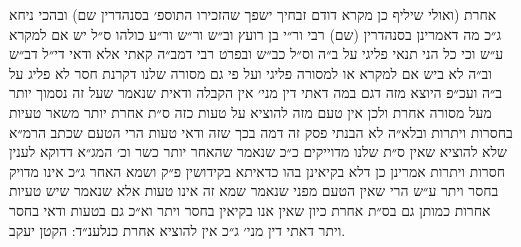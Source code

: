 \documentclass[12pt, openany]{book}
\begin{document}
\begin{multicols}{2}
אחרת (ואולי שיליף כן מקרא דודם זבחיך ישפך שהזכירו התוספ׳ בסנהדרין שם) ובהכי ניחא ג״כ מה דאמרינן בסנהדרין (שם) רבי ור״י בן רועץ וב״ש ור״ש ור״ע כולהו ס״ל יש אם למקרא ע״ש וכי כל הני תנאי פליגי על ב״ה וס״ל כב״ש ובפרט רבי דמב״ה קאתי אלא ודאי די״ל דב״ש וב״ה לא ביש אם למקרא או למסורה פליגי ועל פי גם מסורה שלנו דקרנת חסר לא פליג על ב״ה ועכ״פ היוצא מזה דגם במה דאתי דין מני׳ אין הקבלה ודאית שנאמר שעל זה נסמוך יותר מעל מסורה אחרת ולכן אין טעם מזה להוציא על טעות כזה ס״ת אחרת יותר משאר טעיות בחסרות ויתרות ובלא״ה לא הבנתי פסק זה דמה בכך שזה ודאי טעות הרי הטעם שכתב הרמ״א שלא להוציא שאין ס״ת שלנו מדוייקים כ״כ שנאמר שהאחר יותר כשר וכ׳ המג״א דדוקא לענין חסרות ויתרות אמרינן כן דלא בקיאינן בהו כדאיתא בקידושין פ״ק ושמא האחר ג״כ אינו מדויק בחסר ויתר ע״ש הרי שאין הטעם מפני שנאמר שמא זה אינו טעות אלא שנאמר שיש טעיות אחרות כמותן גם בס״ת אחרת כיון שאין אנו בקיאין בחסר ויתר וא״כ גם בטעות ודאי בחסר ויתר דאתי דין מני׳ ג״כ אין להוציא אחרת כנלענ״ד: הקטן יעקב.\\\vspace{0pt}

\end{multicols}\newpage
\end{document}
